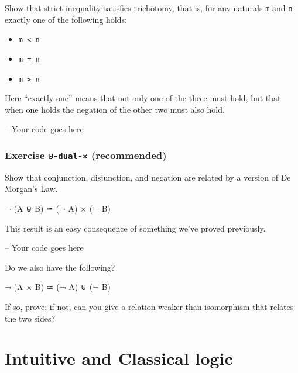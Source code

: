 Show that strict inequality satisfies
\protect\hyperlink{Relations-trichotomy}{trichotomy}, that is, for any
naturals \texttt{m} and \texttt{n} exactly one of the following holds:

\begin{itemize}
\tightlist
\item
  \texttt{m\ \textless{}\ n}
\item
  \texttt{m\ ≡\ n}
\item
  \texttt{m\ \textgreater{}\ n}
\end{itemize}

Here ``exactly one'' means that not only one of the three must hold, but
that when one holds the negation of the other two must also hold.

\begin{fence}
\begin{code}
-- Your code goes here
\end{code}
\end{fence}

\hypertarget{exercise--dual--recommended}{%
\subsubsection{\texorpdfstring{Exercise \texttt{⊎-dual-×}
(recommended)}{Exercise ⊎-dual-× (recommended)}}\label{exercise--dual--recommended}}

Show that conjunction, disjunction, and negation are related by a
version of De Morgan's Law.

\begin{myDisplay}
¬ (A ⊎ B) ≃ (¬ A) × (¬ B)
\end{myDisplay}

This result is an easy consequence of something we've proved previously.

\begin{fence}
\begin{code}
-- Your code goes here
\end{code}
\end{fence}

Do we also have the following?

\begin{myDisplay}
¬ (A × B) ≃ (¬ A) ⊎ (¬ B)
\end{myDisplay}

If so, prove; if not, can you give a relation weaker than isomorphism
that relates the two sides?

\hypertarget{intuitive-and-classical-logic}{%
\section{Intuitive and Classical
logic}\label{intuitive-and-classical-logic}}

